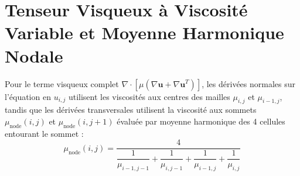 \documentclass[10pt,a4paper,oneside]{book}
\begin{document}
\section{Tenseur Visqueux à Viscosité Variable et Moyenne Harmonique Nodale}
Pour le terme visqueux complet $\nabla \cdot [\mu(\nabla \mathbf{u} + \nabla \mathbf{u}^T)]$, les dérivées normales sur l'équation en $u_{i,j}$ utilisent les viscosités aux centres des mailles $\mu_{i,j}$ et $\mu_{i-1,j}$, tandis que les dérivées transversales utilisent la viscosité aux sommets $\mu_{\text{node}}(i, j)$ et $\mu_{\text{node}}(i, j+1)$ évaluée par moyenne harmonique des 4 cellules entourant le sommet :
\begin{equation}
  \mu_{\text{node}}(i, j) = \frac{4}{\dfrac{1}{\mu_{i-1,j-1}} + \dfrac{1}{\mu_{i,j-1}} + \dfrac{1}{\mu_{i-1,j}} + \dfrac{1}{\mu_{i,j}}}
\end{equation}
\end{document}
